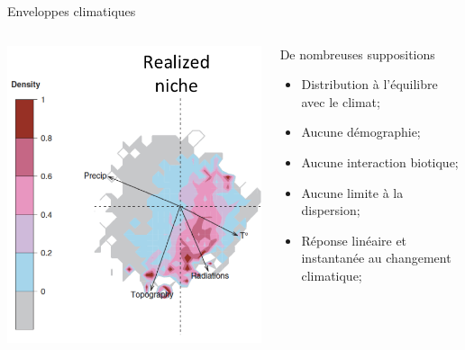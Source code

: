 \documentclass{eecslides}
\begin{document}
	\begin{frame}{Enveloppes climatiques}
		\begin{columns}
			\begin{column}{0.5\textwidth}
				\begin{center}
					\includegraphics[height=0.5\textheight]{boulangeat}
				\end{center}
			\end{column}
			\begin{column}{0.5\textwidth}
			De nombreuses suppositions
				\begin{itemize}
					\item Distribution à l'équilibre avec le climat;
					\item Aucune démographie;
					\item Aucune interaction biotique;
					\item Aucune limite à la dispersion;
					\item Réponse linéaire et instantanée au changement climatique;					
				\end{itemize}
			\end{column}
		\end{columns}	    	
	\end{frame}
\end{document}
